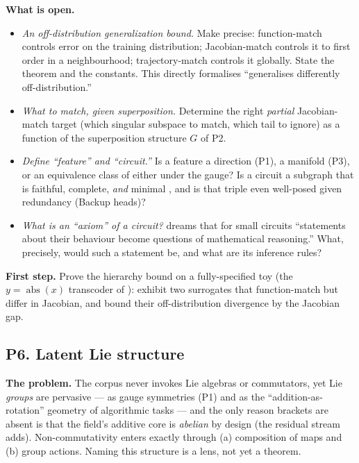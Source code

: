 \textbf{What is open.}
\begin{itemize}
\item \emph{An off-distribution generalization bound.} Make precise: function-match controls error
  on the training distribution; Jacobian-match controls it to first order in a neighbourhood;
  trajectory-match controls it globally. State the theorem and the constants. This directly
  formalises ``generalises differently off-distribution.''
\item \emph{What to match, given superposition.} Determine the right \emph{partial} Jacobian-match
  target (which singular subspace to match, which tail to ignore) as a function of the
  superposition structure $G$ of P2.
\item \emph{Define ``feature'' and ``circuit.''} Is a feature a direction (P1), a manifold (P3),
  or an equivalence class of either under the gauge? Is a circuit a subgraph that is faithful,
  complete, \emph{and} minimal \parencite{interpretability-in-the-wild-ioi}, and is that triple
  even well-posed given redundancy (Backup heads)?
\item \emph{What is an ``axiom'' of a circuit?} \textcite{interpretability-dreams} dreams that for
  small circuits ``statements about their behaviour become questions of mathematical reasoning.''
  What, precisely, would such a statement be, and what are its inference rules?
\end{itemize}

\textbf{First step.} Prove the hierarchy bound on a fully-specified toy (the $y=\operatorname{abs}(x)$
transcoder of \textcite{toy-model-of-mechanistic-unfaithfulness}): exhibit two surrogates that
function-match but differ in Jacobian, and bound their off-distribution divergence by the Jacobian
gap.

\subsection*{P6. Latent Lie structure}

\textbf{The problem.} The corpus never invokes Lie algebras or commutators, yet Lie \emph{groups}
are pervasive --- as gauge symmetries (P1) and as the ``addition-as-rotation'' geometry of
algorithmic tasks --- and the only reason brackets are absent is that the field's additive core is
\emph{abelian} by design (the residual stream adds). Non-commutativity enters exactly through
(a) composition of maps and (b) group actions. Naming this structure is a lens, not yet a theorem.


